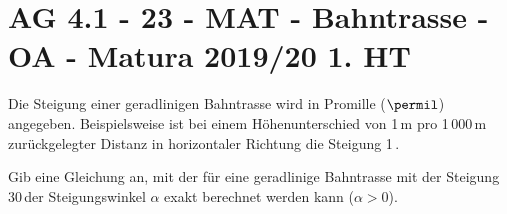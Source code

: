 \section{AG 4.1 - 23 - MAT - Bahntrasse - OA - Matura 2019/20 1. HT}

\begin{beispiel}[AG 4.1]{1}
Die Steigung einer geradlinigen Bahntrasse wird in Promille ($\permil$) angegeben. Beispielsweise ist bei einem Höhenunterschied von 1\,m pro 1\,000\,m zurückgelegter Distanz in horizontaler Richtung die Steigung 1\,\permil.

Gib eine Gleichung an, mit der für eine geradlinige Bahntrasse mit der Steigung 30\,\permil der Steigungswinkel $\alpha$ exakt berechnet werden kann ($\alpha>0$).\leer

\end{beispiel}
